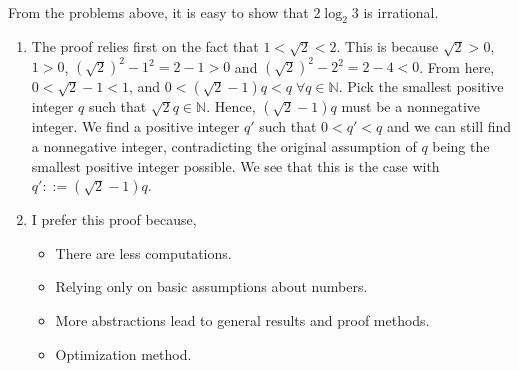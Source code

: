 \begin{pr}\leavevmode
    \\
    From the problems above, it is easy to show that $2\log_2 3$ is irrational.
\end{pr}

\begin{pr}\leavevmode
    \begin{enumerate}[label=\textbf{(\alph*)}]
        \item The proof relies first on the fact that $1 < \sqrt{2} < 2$. This is
        because $\sqrt{2} > 0$, $1 > 0$, $(\sqrt{2})^2 - 1^2 = 2 - 1 > 0$ and
        $(\sqrt{2})^2 - 2^2 = 2 - 4 < 0$. From here, $0 < \sqrt{2} - 1 < 1$, and
        $0 < (\sqrt{2} - 1)q < q \;\forall q \in \mathbb{N}$.
        Pick the smallest positive integer $q$ such that
        $\sqrt{2}q \in \mathbb{N}$.
        Hence, $(\sqrt{2} - 1)q$ must be a nonnegative
        integer. We find a positive integer $q'$ such that $0 < q' < q$ and
        we can still find a nonnegative integer, contradicting the original
        assumption of $q$ being the smallest positive integer possible.
        We see that this is the case with $q' ::= (\sqrt{2} - 1)q$.
        \item I prefer this proof because,
        \begin{itemize}
            \item There are less computations.
            \item Relying only on basic assumptions about numbers.
            \item More abstractions lead to general results and
            proof methods.
            \item Optimization method.
        \end{itemize}
    \end{enumerate}
\end{pr}

